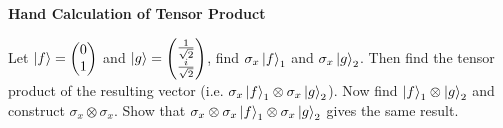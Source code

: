 \documentclass[a4paper, 10pt]{article}
\begin{document}
\begin{problem}
\textbf{Hand Calculation of Tensor Product}
\par Let \( \displaystyle \ket{f} = \begin{pmatrix}
	0 \\ 1
\end{pmatrix} \) and \( \displaystyle \ket{g} = \begin{pmatrix}
	\frac{1}{\sqrt{2}} \\ \frac{i}{\sqrt{2}}
\end{pmatrix} \), find \( \sigma_x \ket{f}_1 \) and \( \sigma_x \ket{g}_2 \).
Then find the tensor product of the resulting vector (i.e. \( \sigma_x \ket{f}_1 \otimes \sigma_x \ket{g}_2 \)).
Now find \( \ket{f}_1 \otimes \ket{g}_2 \) and construct \( \sigma_x \otimes \sigma_x \).
Show that \( \sigma_x \otimes \sigma_x \ket{f}_1 \otimes \sigma_x \ket{g}_2 \) gives the same result.
\end{problem}
\end{document}
